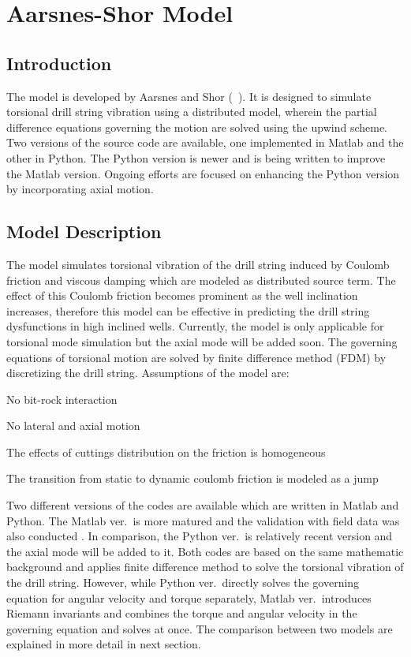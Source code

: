 \chapter{Aarsnes-Shor Model}
\label{ch:aarnessshormodel}

\section{Introduction}
The model is developed by Aarsnes and Shor (~\cite{ref:aarsnes2017a}). It is designed to simulate torsional drill string vibration using a distributed model, wherein the partial difference equations governing the motion are solved using the upwind scheme.   Two versions of the source code are available, one implemented in Matlab and the other in Python.  The Python version is newer and is being written to improve the Matlab version.  Ongoing efforts are focused on enhancing the Python version by incorporating axial motion.

\section{Model Description}
The model simulates torsional vibration of the drill string induced by Coulomb friction and viscous damping which are modeled as distributed source term. The effect of this Coulomb friction becomes prominent as the well inclination increases, therefore this model can be effective in predicting the drill string dysfunctions in high inclined wells. Currently, the model is only applicable for torsional mode simulation but the axial mode will be added soon. The governing equations of torsional motion are solved by finite difference method (FDM) by discretizing the drill string. Assumptions of the model are:
\begin{bulletedlist}
	\item No bit-rock interaction
	\item No lateral and axial motion
	\item The effects of cuttings distribution on the friction is homogeneous
	\item The transition from static to dynamic coulomb friction is modeled as a jump
\end{bulletedlist}

Two different versions of the codes are available which are written in Matlab and Python. The Matlab ver.\ is more matured and the validation with field data was also conducted \cite{ref:aarsnes2017a}. In comparison, the Python ver.\ is relatively recent version and the axial mode will be added to it. Both codes are based on the same mathematic background and applies finite difference method to solve the torsional vibration of the drill string. However, while Python ver.\ directly solves the governing equation for angular velocity and torque separately, Matlab ver.\ introduces Riemann invariants and combines the torque and angular velocity in the governing equation and solves at once. The comparison between two models are explained in more detail in next section. 

